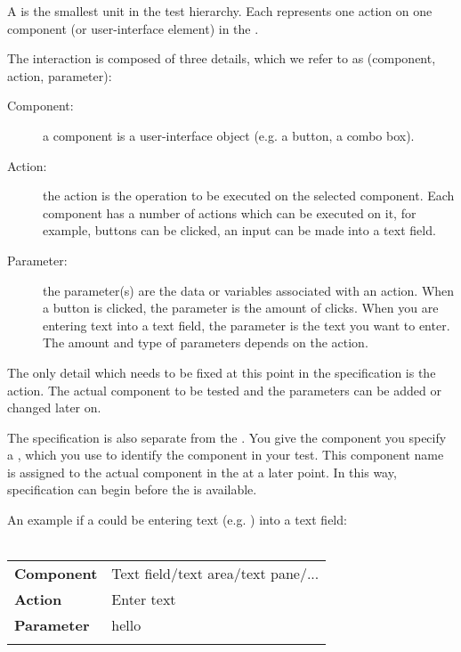 \label{teststeps}

A \gdstep{} is the smallest unit in the test hierarchy. Each \gdstep{} represents one action on one component (or user-interface element) in the  \gdaut{}. 

The interaction is composed of three details, which we refer to as  (component, action, parameter):

\begin{description}
\item [Component:]{a component is a user-interface object (e.g. a button, a combo box).}
\item [Action:]{the action is the operation to be executed on the selected component. Each component has a number of actions which can be executed on it, for example, buttons can be clicked, an input can be made into a text field. }
\item [Parameter:]{the parameter(s) are the data or variables associated with an action. When a button is clicked, the parameter is the amount of clicks. When you are entering text into a text field, the parameter is the text you want to enter. The amount and type of parameters depends on the action.}
\end{description}

The only detail which needs to be fixed at this point in the specification is the action. The actual component to be tested and the parameters can be added or changed later on. 

The specification is also separate from the \gdaut{}. You give the component you specify a , which you use to identify the component in your test. This component name is assigned to the actual component in the \gdaut{} at a later point. In this way, specification can begin before the \gdaut{} is available. 

An example if  a \gdstep{} could be entering text (e.g. ) into a text field:
\\
\\
\begin{tabular}{p{0.3\bxpicwidth}p{0.3\bxpicwidth}}
 \textbf{Component}& Text field/text area/text pane/... \\
 \textbf{Action} & Enter text\\
 \textbf{Parameter} & hello\\
\\
\end{tabular}

